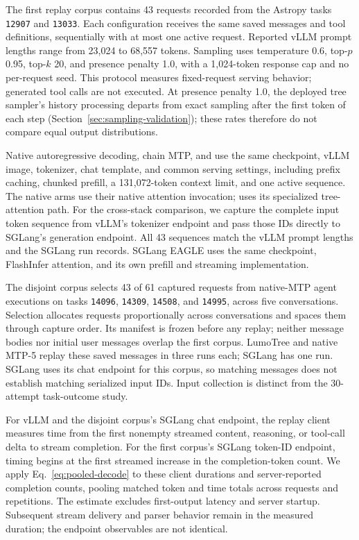 The first replay corpus contains 43 requests recorded from the Astropy tasks \texttt{12907} and \texttt{13033}. Each configuration receives the same saved messages and tool definitions, sequentially with at most one active request. Reported vLLM prompt lengths range from 23,024 to 68,557 tokens. Sampling uses temperature 0.6, top-$p$ 0.95, top-$k$ 20, and presence penalty 1.0, with a 1,024-token response cap and no per-request seed. This protocol measures fixed-request serving behavior; generated tool calls are not executed. At presence penalty 1.0, the deployed tree sampler's history processing departs from exact sampling after the first token of each step (Section~\ref{sec:sampling-validation}); these rates therefore do not compare equal output distributions.

Native autoregressive decoding, chain MTP, and \sys{} use the same checkpoint, vLLM image, tokenizer, chat template, and common serving settings, including prefix caching, chunked prefill, a 131,072-token context limit, and one active sequence. The native arms use their native attention invocation; \sys{} uses its specialized tree-attention path. For the cross-stack comparison, we capture the complete input token sequence from vLLM's tokenizer endpoint and pass those IDs directly to SGLang's generation endpoint. All 43 sequences match the vLLM prompt lengths and the SGLang run records. SGLang EAGLE uses the same checkpoint, FlashInfer attention, and its own prefill and streaming implementation.

The disjoint corpus selects 43 of 61 captured requests from native-MTP agent executions on tasks \texttt{14096}, \texttt{14309}, \texttt{14508}, and \texttt{14995}, across five conversations. Selection allocates requests proportionally across conversations and spaces them through capture order. Its manifest is frozen before any replay; neither message bodies nor initial user messages overlap the first corpus. LumoTree and native MTP-5 replay these saved messages in three runs each; SGLang has one run. SGLang uses its chat endpoint for this corpus, so matching messages does not establish matching serialized input IDs. Input collection is distinct from the 30-attempt task-outcome study.

For vLLM and the disjoint corpus's SGLang chat endpoint, the replay client measures time from the first nonempty streamed content, reasoning, or tool-call delta to stream completion. For the first corpus's SGLang token-ID endpoint, timing begins at the first streamed increase in the completion-token count. We apply Eq.~\ref{eq:pooled-decode} to these client durations and server-reported completion counts, pooling matched token and time totals across requests and repetitions. The estimate excludes first-output latency and server startup. Subsequent stream delivery and parser behavior remain in the measured duration; the endpoint observables are not identical.
